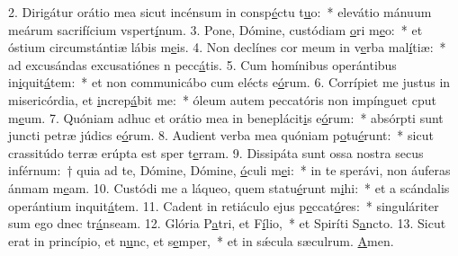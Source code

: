 2. Dirigátur orátio mea sicut incénsum in consp\uline{é}ctu t\uline{u}o:~* elevátio mánuum meárum sacrifícium vspert\uline{í}num.
3. Pone, Dómine, custódiam \uline{o}ri m\uline{e}o:~* et óstium circumstántiæ lábis m\uline{e}is.
4. Non declínes cor meum in v\uline{e}rba mal\uline{í}tiæ:~* ad excusándas excusatiónes n pecc\uline{á}tis.
5. Cum homínibus operántibus in\uline{i}quit\uline{á}tem:~* et non communicábo cum elécts e\uline{ó}rum.
6. Corrípiet me justus in misericórdia, et \uline{i}ncrep\uline{á}bit me:~* óleum autem peccatóris non impínguet cput m\uline{e}um.
7. Quóniam adhuc et orátio mea in beneplácit\uline{i}s e\uline{ó}rum:~* absórpti sunt juncti petræ júdics e\uline{ó}rum.
8. Audient verba mea quóniam p\uline{o}tu\uline{é}runt:~* sicut crassitúdo terræ erúpta est sper t\uline{e}rram.
9. Dissipáta sunt ossa nostra secus inférnum:~† quia ad te, Dómine, Dómine, \uline{ó}culi m\uline{e}i:~* in te sperávi, non áuferas ánmam m\uline{e}am.
10. Custódi me a láqueo, quem statu\uline{é}runt m\uline{i}hi:~* et a scándalis operántium inquit\uline{á}tem.
11. Cadent in retiáculo ejus p\uline{e}ccat\uline{ó}res:~* singuláriter sum ego dnec tr\uline{á}nseam.
12. Glória P\uline{a}tri, et F\uline{í}lio,~* et Spiríti S\uline{a}ncto.
13. Sicut erat in princípio, et n\uline{u}nc, et s\uline{e}mper,~* et in sǽcula sæculrum. \uline{A}men.

